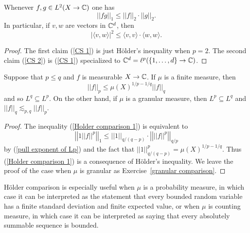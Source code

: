 \begin{corollary}
Whenever $f, g \in L^2(X \to \mathbb{C})$ one has
\begin{equation}\label{CS 1}
||fg||_1 \leq ||f||_2 \cdot ||g||_2.
\end{equation}
In particular, if $v, w$ are vectors in $\mathbb{C}^d$, then
\begin{equation}\label{CS 2}
|\langle v, w\rangle|^2 \leq \langle v, v\rangle \cdot \langle w, w\rangle.
\end{equation}
\end{corollary}
\begin{proof}
The first claim (\ref{CS 1}) is just H\"older's inequality when $p = 2$.
The second claim (\ref{CS 2}) is (\ref{CS 1}) specialized to $\mathbb{C}^{d} = \ell^p(\{1, \dots, d\} \to \mathbb{C})$.
\end{proof}

\begin{corollary}\label{Holder comparison}
Suppose that $p \leq q$ and $f$ is measurable $X \to \mathbb{C}$.
If $\mu$ is a finite measure, then
\begin{equation}\label{Holder comparison 1}
||f||_{p}  \leq \mu(X)^{1/p-1/q} ||f||_q
\end{equation}
and so $L^{q} \subseteq L^p$.
On the other hand, if $\mu$ is a granular measure, then $L^{p} \subseteq L^q$ and $||f||_{q} \lesssim_{p,q} ||f||_{p} $.
\end{corollary}
\begin{proof}
The inequality (\ref{Holder comparison 1}) is equivalent to
\[\left|\left|1 ||f||^p\right|\right|_1 \leq ||1||_{q/(q-p)} \cdot \left|\left| ||f||^p\right|\right|_{q/p}\]
by (\ref{pull exponent of Lp}) and the fact that $||1||_{q/(q-p)}^{p} = \mu(X)^{1/p-1/q}$.
Thus (\ref{Holder comparison 1}) is a consequence of H\"older's inequality.
We leave the proof of the case when $\mu$ is granular as Exercise~\ref{granular comparison}.
\end{proof}

H\"older comparison is especially useful when $\mu$ is a probability measure, in which case it can be interpreted as the statement that every bounded random variable has a finite standard deviation and finite expected value, or when $\mu$ is counting measure, in which case it can be interpreted as saying that every absolutely summable sequence is bounded.

